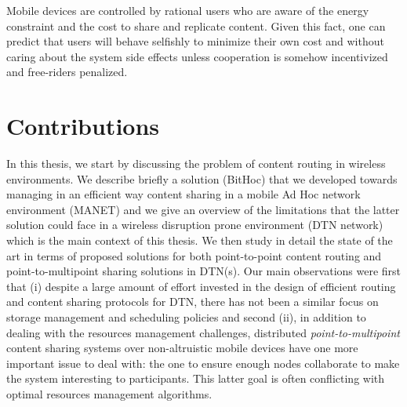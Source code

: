 Mobile devices are controlled by rational users who are aware of the energy constraint and the cost to share and replicate content. Given this fact, one can predict that users will behave selfishly to minimize their own cost and without caring about the system side effects unless cooperation is somehow incentivized and free-riders penalized. 

\section{Contributions}

In this thesis, we start by discussing the problem of content routing in wireless environments. We describe briefly a solution (BitHoc) that we developed towards managing in an efficient way content sharing in a mobile Ad Hoc network environment (MANET) and we give an overview of the limitations that the latter solution could face in a wireless disruption prone environment (DTN network) which is the main context of this thesis. We then study in detail the state of the art in terms of proposed solutions for both point-to-point content routing and point-to-multipoint sharing solutions in DTN(s). Our main observations were first that (i) despite a large amount of effort invested in the design of efficient routing and content sharing protocols for DTN, there has not been a similar focus on storage management and scheduling policies and second (ii), in addition to dealing with the resources management challenges, distributed \emph{point-to-multipoint} content sharing systems over non-altruistic mobile devices have one more important issue to deal with: the one to ensure enough nodes collaborate to make the system interesting to participants. This latter goal is often conflicting with optimal resources management algorithms. 

